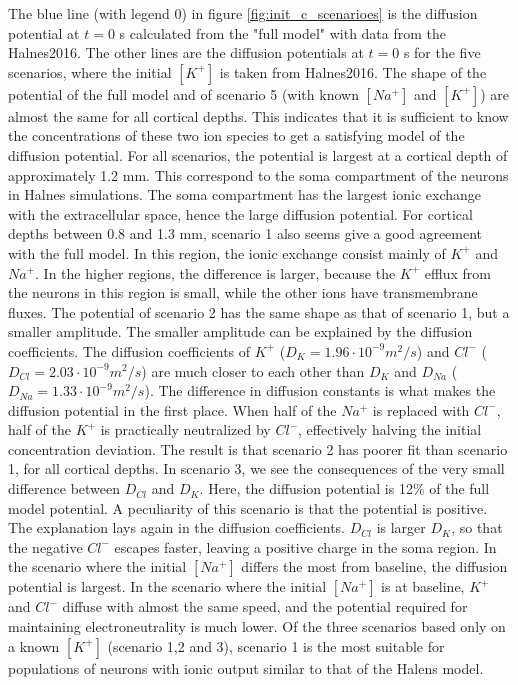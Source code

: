 \documentclass{article}
\begin{document}
The blue line (with legend 0) in figure \ref{fig:init_c_scenarioes} is the diffusion potential at $t=0$ s calculated from the "full model" with data from the Halnes2016. The other lines are the diffusion potentials at $t=0$ s for the five scenarios, where the initial $[K^+]$ is taken from Halnes2016.  The shape of the potential of the full model and of scenario 5 (with known $[Na^+]$ and $[K^+]$) are almost the same for all cortical depths. This indicates that it is sufficient to know the concentrations of these two ion species to get a satisfying model of the diffusion potential. For all scenarios, the potential is largest at a cortical depth of approximately 1.2 mm. This correspond to the soma compartment of the neurons in Halnes simulations. The soma compartment has the largest ionic exchange with the extracellular space, hence the large diffusion potential. For cortical depths between 0.8 and 1.3 mm, scenario 1 also seems give a good agreement with the full model. In this region, the ionic exchange consist mainly of $K^+$ and $Na^+$. In the higher regions, the difference is larger, because the $K^+$ efflux from the neurons in this region is small, while the other ions have transmembrane fluxes. The potential of scenario 2 has the same shape as that of scenario 1, but a smaller amplitude. The smaller amplitude can be explained by the diffusion coefficients. The diffusion coefficients of $K^+$ ($D_K = 1.96\cdot 10^{-9}m^2/s$) and $Cl^-$ ($D_{Cl} = 2.03\cdot 10^{-9}m^2/s$) are much closer to each other than $D_K$ and $D_{Na}$ ($D_{Na} = 1.33\cdot 10^{-9}m^2/s$).  The difference in diffusion constants is what makes the diffusion potential in the first place. When half of the $Na^+ $ is replaced with $Cl^-$, half of the $K^+$ is practically neutralized by $Cl^-$, effectively halving the initial concentration deviation. The result is that scenario 2 has poorer fit than scenario 1, for all cortical depths. In scenario 3, we see the consequences of the very small difference between $D_{Cl}$ and $D_K$. Here, the diffusion potential is 12\% of the full model potential. A peculiarity of this scenario is that the potential is positive. The explanation lays again in the diffusion coefficients. $D_{Cl}$ is larger $D_K$, so that the negative $Cl^-$ escapes faster, leaving a positive charge in the soma region. In the scenario where the initial $[Na^+]$ differs the most from baseline, the diffusion potential is largest. In the scenario where the initial $[Na^+]$ is at baseline, $K^+$ and $Cl^-$ diffuse with almost the same speed, and the potential required for maintaining electroneutrality is much lower. Of the three scenarios based only on a known $[K^+]$ (scenario 1,2 and 3), scenario 1 is the most suitable for populations of neurons with ionic output similar to that of the Halens model.
\end{document}
